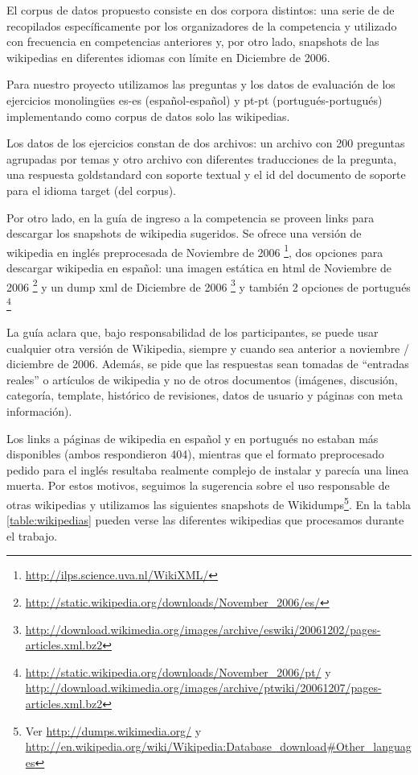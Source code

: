 El corpus de datos propuesto consiste en dos corpora distintos: una serie de de recopilados específicamente por los organizadores de la competencia y utilizado con frecuencia en competencias anteriores y, por otro lado, snapshots de las wikipedias en diferentes idiomas con límite en Diciembre de 2006.

Para nuestro proyecto utilizamos las preguntas y los datos de evaluación de los ejercicios monolingües es-es (español-español) y pt-pt (portugués-portugués) implementando como corpus de datos solo las wikipedias.

Los datos de los ejercicios constan de dos archivos: un archivo con 200 preguntas agrupadas por temas y otro archivo con diferentes traducciones de la pregunta, una respuesta goldstandard con soporte textual y el id del documento de soporte para el idioma target (del corpus).

Por otro lado, en la guía de ingreso a la competencia\cite{GuidelineClef07} se proveen links para descargar los snapshots de wikipedia sugeridos. Se ofrece una versión de wikipedia en inglés preprocesada de Noviembre de 2006 \footnote{\url{http://ilps.science.uva.nl/WikiXML/}}, dos opciones para descargar wikipedia en español: una imagen estática en html de Noviembre de 2006 \footnote{\url{http://static.wikipedia.org/downloads/November_2006/es/}} y un dump xml de Diciembre de 2006 \footnote{\url{http://download.wikimedia.org/images/archive/eswiki/20061202/pages-articles.xml.bz2}} y también 2 opciones de portugués \footnote{\url{http://static.wikipedia.org/downloads/November_2006/pt/} y \url{http://download.wikimedia.org/images/archive/ptwiki/20061207/pages-articles.xml.bz2}}

La guía aclara que, bajo responsabilidad de los participantes, se puede usar
cualquier otra versión de Wikipedia, siempre y cuando sea anterior a noviembre / diciembre de 2006.
Además, se pide que las respuestas sean tomadas de ``entradas reales'' o artículos de wikipedia y
no de otros documentos (imágenes, discusión, categoría, template, histórico de revisiones, datos de usuario y páginas con meta información).

Los links a páginas de wikipedia en español y en portugués no estaban más disponibles (ambos respondieron 404), mientras que el formato preprocesado pedido para el inglés resultaba realmente complejo de instalar y parecía una linea muerta. Por estos motivos, seguimos la sugerencia sobre el uso responsable de otras wikipedias y utilizamos las siguientes snapshots de Wikidumps\footnote{Ver \url{http://dumps.wikimedia.org/} y \url{http://en.wikipedia.org/wiki/Wikipedia:Database_download\#Other_languages}}. En la tabla \ref{table:wikipedias} pueden verse las diferentes wikipedias que procesamos durante el trabajo.


